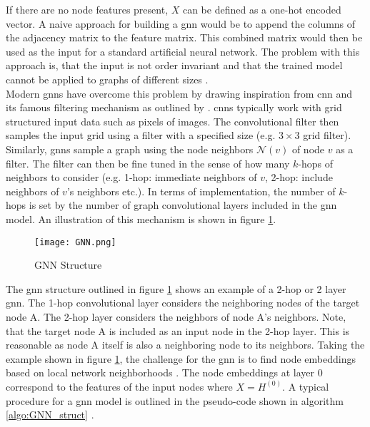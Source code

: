 	\noindent If there are no node features present, $X$ can be defined as a 
	one-hot encoded vector. A naive approach for building a \acs{gnn} would be to
	append the columns of the adjacency matrix to the feature matrix. This
	combined matrix would then be used as the input for a standard
	artificial neural network. The problem with this approach is, that the 
	input is not order invariant and that the trained model cannot be applied 
	to graphs of different sizes \citep{leskovec2021lecture}. \\

	\noindent Modern \acs{gnn}s have overcome this problem by drawing inspiration 
	from \ac{cnn} and its famous filtering mechanism as outlined by 
	\cite{krizhevsky2012imagenet}. \acs{cnn}s typically work with grid 
	structured input data such as pixels of images. The convolutional filter 
	then samples the input grid using a filter with a specified size 
	(e.g. $3\times3$ grid filter). Similarly, \acs{gnn}s sample a graph using the node 
	neighbors $\mathcal{N}(v)$ of node $v$ as a filter. The filter can then be 
	fine tuned in the sense of how many $k$-hops of neighbors to consider 
	(e.g. 1-hop: immediate neighbors of $v$, 2-hop: include neighbors of $v$'s 
	neighbors etc.). In terms of implementation, the number of $k$-hops is set 
	by the number of graph convolutional layers included in the \acs{gnn} model. 
	An illustration of this mechanism is shown in figure \ref{fig:GNN_structure}. \\

	\begin{figure}[h]
		\centering
		\texttt{[image: GNN.png]}
		\caption{GNN Structure}
		\cite{leskovec2021lecture}
		\label{fig:GNN_structure}
	\end{figure}

	\noindent The \acs{gnn} structure outlined in figure \ref{fig:GNN_structure} 
	shows an example of a 2-hop or 2 layer \acs{gnn}. The 1-hop convolutional layer 
	considers the neighboring nodes of the target node A. The 2-hop layer 
	considers the neighbors of node A's neighbors. Note, that the target node A 
	is included as an input node in the 2-hop layer. This is reasonable as node 
	A itself is also a neighboring node to its neighbors. Taking the example 
	shown in figure \ref{fig:GNN_structure}, the challenge for the \acs{gnn} is to 
	find node embeddings based on local network neighborhoods \citep{leskovec2021lecture}. 
	The node embeddings at layer 0 correspond to the features of the input nodes 
	where $X = H^{(0)}$. A typical procedure for a \acs{gnn} model is outlined in the
	pseudo-code shown in algorithm \ref{algo:GNN_struct} 
	\citep{hamilton2017inductive,leskovec2021lecture,you2020design}.	

